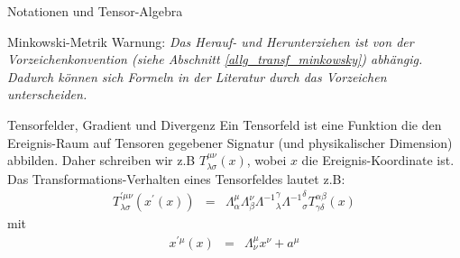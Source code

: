 \begin{chapter}{\titlestr}
\begin{section}{Notationen und Tensor-Algebra}
\begin{subsection}{Minkowski-Metrik}
Warnung: \textit{Das Herauf- und Herunterziehen ist von der Vorzeichenkonvention (siehe Abschnitt \ref{allg_transf_minkowsky})
abhängig. Dadurch können sich Formeln in der Literatur durch das Vorzeichen unterscheiden.}
\end{subsection}

\begin{subsection}{Tensorfelder, Gradient und Divergenz}
Ein Tensorfeld ist eine Funktion die den Ereignis-Raum auf Tensoren gegebener Signatur (und physikalischer Dimension) abbilden.
Daher schreiben wir z.B $T^{\mu\nu}_{\lambda\sigma}(x)$, wobei $x$ die Ereignis-Koordinate ist. Das Transformations-Verhalten
eines Tensorfeldes lautet z.B:
\begin{eqnarray}
\label{tensor_field_transf}
T^{\prime\mu\nu}_{\lambda\sigma}(x^\prime(x))
&=& \Lambda^\mu_\alpha\Lambda^\nu_\beta {\Lambda^{-1}}_\lambda^\gamma{\Lambda^{-1}}_\sigma^\delta T^{\alpha\beta}_{\gamma\delta}(x)
\end{eqnarray}
mit
\begin{eqnarray*}
x^{\prime\mu}(x) &=& \Lambda^\mu_\nu x^\nu+a^\mu\\
\end{eqnarray*}


\end{subsection}
\end{section}
\end{chapter}

